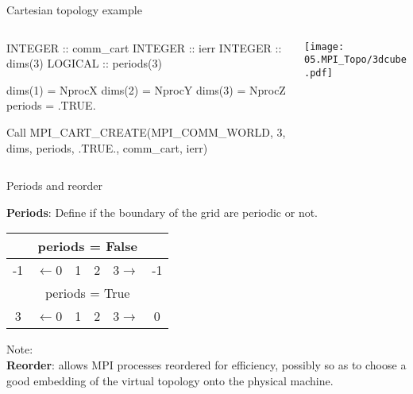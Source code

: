 \documentclass[aspectratio=43]{beamer}
\begin{document}
\begin{frame}[fragile]{Cartesian topology example}
\footnotesize
\vspace{-1.3cm}
\begin{columns}
\begin{column}{0.55\paperwidth}
\begin{Fortranlisting}[]{}
INTEGER :: comm_cart
INTEGER :: ierr
INTEGER :: dims(3)
LOGICAL :: periods(3)

dims(1) = NprocX
dims(2) = NprocY
dims(3) = NprocZ
periods = .TRUE.

Call MPI_CART_CREATE(MPI_COMM_WORLD, 3, dims, periods, .TRUE., comm_cart, ierr)
\end{Fortranlisting}
\end{column}
\begin{column}{0.4\paperwidth}
\texttt{[image: 05.MPI\_Topo/3dcube.pdf]}
\end{column}
\end{columns}
\end{frame}

\begin{frame}[fragile]{Periods and reorder}

\textbf{Periods}: Define if the boundary of the grid are periodic or not.\\
\begin{center}
\begin{tabular}{cccccc}
    \multicolumn{6}{c}{periods = False} \\\hline
    \color{cscsred}-1 & $\leftarrow$\color{cscsblue}0 &\color{cscsblue}1 & \color{cscsblue}2 & {\color{cscsblue}3}$\rightarrow$ & \color{cscsred}-1\\\hline
    \multicolumn{6}{c}{periods = True} \\\hline
    \color{cscsred}3 & $\leftarrow$\color{cscsblue}0 & \color{cscsblue}1 & \color{cscsblue}2 & {\color{cscsblue}3}$\rightarrow$ & \color{cscsred}0\\\hline
\end{tabular}
\end{center}
Note: \\

\textbf{Reorder}: allows MPI processes reordered for efficiency, possibly so as to choose a good embedding of the virtual topology onto the physical machine.

\end{frame}
\end{document}
